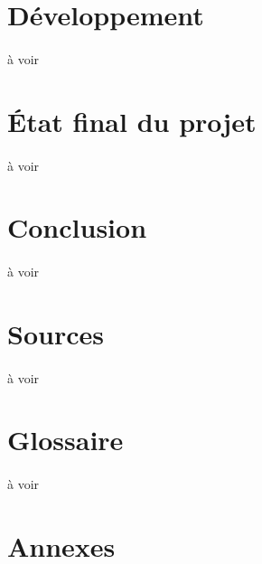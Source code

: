 \documentclass[a4paper,12pt]{extarticle}
\begin{document}
	\section{Développement}
		\paragraph{}
			à voir\\
	\clearpage
	
	\section{État final du projet}
		\paragraph{}
			à voir\\
	\clearpage
	
	\section{Conclusion}
		\paragraph{}
			à voir\\
	\clearpage
	
	\section{Sources}
		\paragraph{}
			à voir\\
	
	\section{Glossaire}
		\paragraph{}
			à voir\\
	\clearpage
	
	\section{Annexes}
		\begin{center}
		\end{center}
\end{document}
